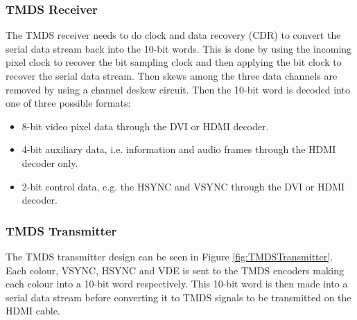 \subsubsection{TMDS Receiver}
The TMDS receiver needs to do clock and data recovery (CDR) to convert the serial data stream back into the 10-bit words.
This is done by using the incoming pixel clock to recover the bit sampling clock and then applying the bit clock to recover the serial data stream.
Then skews among the three data channels are removed by using a channel deskew circuit.
Then the 10-bit word is decoded into one of three possible formats:
\begin{itemize}
    \item   8-bit video pixel data through the DVI or HDMI decoder.
    \item   4-bit auxiliary data, i.e. information and audio frames through the HDMI decoder only.
    \item   2-bit control data, e.g. the HSYNC and VSYNC through the DVI or HDMI decoder.
\end{itemize}

\subsubsection{TMDS Transmitter}
The TMDS transmitter design can be seen in Figure \ref{fig:TMDSTransmitter}.
Each colour, VSYNC, HSYNC and VDE is sent to the TMDS encoders making each colour into a 10-bit word respectively. This 10-bit word is then made into a serial data stream before converting it to TMDS signals to be transmitted on the HDMI cable.

